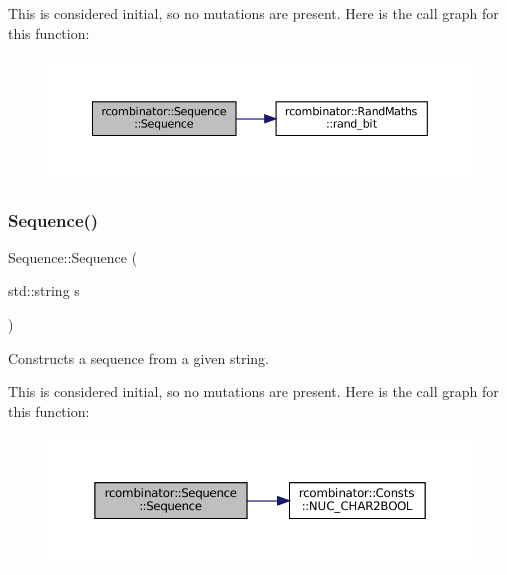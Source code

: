 This is considered initial, so no mutations are present. Here is the call graph for this function\+:
\nopagebreak
\begin{figure}[H]
\begin{center}
\leavevmode
\includegraphics[width=350pt]{classrcombinator_1_1Sequence_afab8bafaf1283f4e699ba9111ee452b3_cgraph}
\end{center}
\end{figure}
\mbox{\label{classrcombinator_1_1Sequence_af5b3b62eba07f0e09f532fcf1681c289}} 
\subsubsection{\texorpdfstring{Sequence()}{Sequence()}\hspace{0.1cm}{\footnotesize\ttfamily [2/3]}}
{\footnotesize\ttfamily Sequence\+::\+Sequence (\begin{DoxyParamCaption}\item[{std\+::string}]{s }\end{DoxyParamCaption})}



Constructs a sequence from a given string. 

This is considered initial, so no mutations are present. Here is the call graph for this function\+:
\nopagebreak
\begin{figure}[H]
\begin{center}
\leavevmode
\includegraphics[width=350pt]{classrcombinator_1_1Sequence_af5b3b62eba07f0e09f532fcf1681c289_cgraph}
\end{center}
\end{figure}
\mbox{\label{classrcombinator_1_1Sequence_a976b331689ec55d9d306281bbff5d22d}} 

